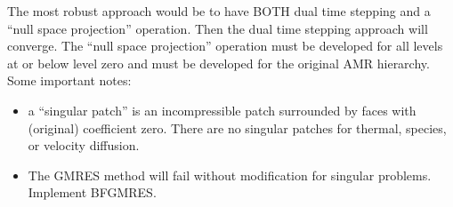 The most robust approach would be to have BOTH dual time stepping
and a ``null space projection'' operation.  Then the dual time stepping
approach will converge.
The ``null space projection'' operation must be developed
for all levels at or below level zero and must be developed for the
original AMR hierarchy.  Some important notes:
\begin{itemize}
\item a ``singular patch'' is an incompressible patch surrounded
  by faces with (original) coefficient zero.   There are no singular patches
  for thermal, species, or velocity diffusion.
\item The GMRES method will fail without modification for singular problems.
 Implement BFGMRES.
\end{itemize}




